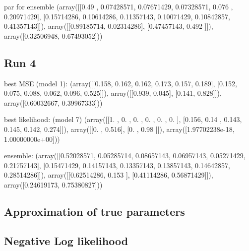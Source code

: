 par for ensemble
(array([[0.49      , 0.07428571, 0.07671429, 0.07328571, 0.076     ,
         0.20971429],
        [0.15714286, 0.10614286, 0.11357143, 0.10071429, 0.10842857,
         0.41357143]]),
 array([[0.89185714, 0.02314286],
        [0.47457143, 0.492     ]]),
 array([0.32506948, 0.67493052]))


\subsection{Run 4}

best MSE (model 1):
(array([[0.158, 0.162, 0.162, 0.173, 0.157, 0.189],
        [0.152, 0.075, 0.088, 0.062, 0.096, 0.525]]),
 array([[0.939, 0.045],
        [0.141, 0.828]]),
 array([0.60032667, 0.39967333]))

best likelihood: (model 7)
(array([[1.   , 0.   , 0.   , 0.   , 0.   , 0.   ],
        [0.156, 0.14 , 0.143, 0.145, 0.142, 0.274]]),
 array([[0.   , 0.516],
        [0.   , 0.98 ]]),
 array([1.97702238e-18, 1.00000000e+00]))

ensemble:
(array([[0.52028571, 0.05285714, 0.08657143, 0.06957143, 0.05271429,
         0.21757143],
        [0.15471429, 0.14157143, 0.13357143, 0.13857143, 0.14642857,
         0.28514286]]),
 array([[0.62514286, 0.153     ],
        [0.41114286, 0.56871429]]),
 array([0.24619173, 0.75380827]))


\subsection{Approximation of true parameters}


\subsection{Negative Log likelihood}




